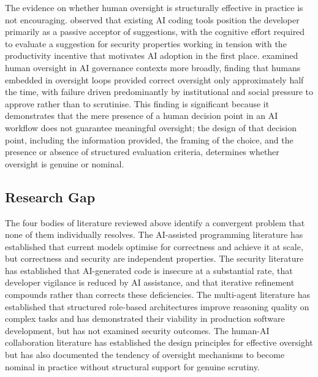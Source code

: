 The evidence on whether human oversight is structurally effective in practice is not encouraging. \citet{perry2023} observed that existing AI coding tools position the developer primarily as a passive acceptor of suggestions, with the cognitive effort required to evaluate a suggestion for security properties working in tension with the productivity incentive that motivates AI adoption in the first place. \citet{kennedy2025} examined human oversight in AI governance contexts more broadly, finding that humans embedded in oversight loops provided correct oversight only approximately half the time, with failure driven predominantly by institutional and social pressure to approve rather than to scrutinise. This finding is significant because it demonstrates that the mere presence of a human decision point in an AI workflow does not guarantee meaningful oversight; the design of that decision point, including the information provided, the framing of the choice, and the presence or absence of structured evaluation criteria, determines whether oversight is genuine or nominal.

\subsection{Research Gap}

The four bodies of literature reviewed above identify a convergent problem that none of them individually resolves. The AI-assisted programming literature has established that current models optimise for correctness and achieve it at scale, but correctness and security are independent properties. The security literature has established that AI-generated code is insecure at a substantial rate, that developer vigilance is reduced by AI assistance, and that iterative refinement compounds rather than corrects these deficiencies. The multi-agent literature has established that structured role-based architectures improve reasoning quality on complex tasks and has demonstrated their viability in production software development, but has not examined security outcomes. The human-AI collaboration literature has established the design principles for effective oversight but has also documented the tendency of oversight mechanisms to become nominal in practice without structural support for genuine scrutiny.

